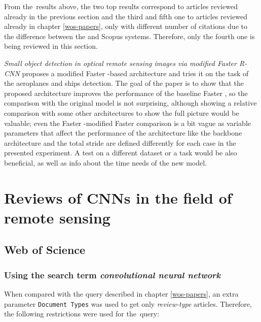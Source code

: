 From the~results above, the two top results correspond to articles reviewed already in the previous section and the third and fifth one to articles reviewed already in chapter \ref{wos-papers}, only with different number of citations due to the difference between the  and Scopus systems. Therefore, only the fourth one is being reviewed in this section.

\textit{Small object detection in optical remote sensing images via modified Faster R-CNN} proposes a modified Faster -based architecture and tries it on the task of the aeroplanes and ships detection. The goal of the paper is to show that the proposed architecture improves the performance of the baseline Faster , so the comparison with the original model is not surprising, although showing a relative comparison with some other architectures to show the full picture would be valuable; even the Faster -modified Faster  comparison is a bit vague as variable parameters that affect the performance of the architecture like the backbone architecture and the total stride are defined differently for each case in the presented experiment. A test on a different dataset or a task would be also beneficial, as well as info about the time needs of the new model.

\section{Reviews of CNNs in the field of remote sensing}
\label{situation}

\subsection{Web of Science}
\label{wos-reviews}

\subsubsection{Using the search term \textit{convolutional neural network}}
\label{wos-reviews-full-length}

When compared with the query described in chapter \ref{wos-papers}, an extra parameter \verb|Document Types| was used to get only \textit{review-type} articles. Therefore, the following restrictions were used for the~query:

